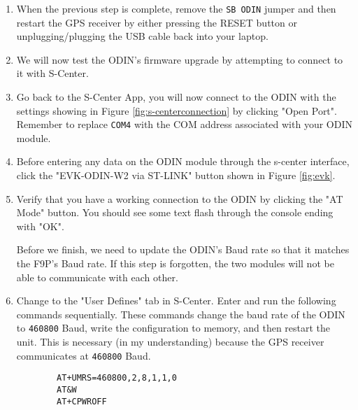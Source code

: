 \documentclass{article}%
\begin{document}
\begin{appendices}
\begin{enumerate}
	\begin{lstlisting}[language=bash]
		.\stm32flash.exe -b 115200 -w .\ODIN-W26X-SW-7.1.0-020.bin -S 0x8010000 COM4
	\end{lstlisting}
	
	\begin{figure}
	\centering
	\begin{minipage}{.5\textwidth}
	  \centering
	  \texttt{[image: ./images\_for\_tutorial/bootload]}
	  \label{fig:bootload}
	\end{minipage}%
	\begin{minipage}{.5\textwidth}
	  \centering
	  \texttt{[image: ./images\_for\_tutorial/odinfirm]}
	  \label{fig:odinfirm}
	\end{minipage}
	\end{figure}
	
	\item When the previous step is complete, remove the \texttt{SB ODIN} jumper and then restart the GPS receiver by either pressing the RESET button or unplugging/plugging the USB cable back into your laptop.
	\item We will now test the ODIN's firmware upgrade by attempting to connect to it with S-Center.
	\item Go back to the S-Center App, you will now connect to the ODIN with the settings showing in Figure \ref{fig:s-centerconnection} by clicking "Open Port".  Remember to replace \texttt{COM4} with the COM address associated with your ODIN module.
	\item Before entering any data on the ODIN module through the s-center interface, click the "EVK-ODIN-W2 via ST-LINK" button shown in Figure \ref{fig:evk}.
	\item Verify that you have a working connection to the ODIN by clicking the "AT Mode" button.  You should see some text flash through the console ending with "OK".

	Before we finish, we need to update the ODIN's Baud rate so that it matches the F9P's Baud rate.  If this step is forgotten, the two modules will not be able to communicate with each other.
	\item Change to the "User Defines" tab in S-Center.  Enter and run the following commands sequentially.  These commands change the baud rate of the ODIN to \texttt{460800} Baud, write the configuration to memory, and then restart the unit.  This is necessary (in my understanding) because the GPS receiver communicates at \texttt{460800} Baud.
		\begin{lstlisting}
		AT+UMRS=460800,2,8,1,1,0
		AT&W
		AT+CPWROFF
		\end{lstlisting}
		

\end{enumerate}
\end{appendices}
\end{document}
